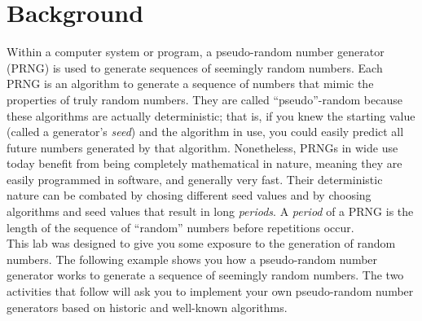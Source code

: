 	\section{Background}
		Within a computer system or program, a pseudo-random number generator (PRNG) is used to generate sequences of seemingly random numbers. Each PRNG is an algorithm to generate a sequence of numbers that mimic the properties of truly random numbers. They are called ``pseudo''-random because these algorithms are actually deterministic; that is, if you knew the starting value (called a generator's \emph{seed}) and the algorithm in use, you could easily predict all future numbers generated by that algorithm. Nonetheless, PRNGs in wide use today benefit from being completely mathematical in nature, meaning they are easily programmed in software, and generally very fast. Their deterministic nature can be combated by chosing different seed values and by choosing algorithms and seed values that result in long \emph{periods}. A \emph{period} of a PRNG is the length of the sequence of ``random'' numbers before repetitions occur.\\[\baselineskip]
		This lab was designed to give you some exposure to the generation of random numbers. The following example shows you how a pseudo-random number generator works to generate a sequence of seemingly random numbers. The two activities that follow will ask you to implement your own pseudo-random number generators based on historic and well-known algorithms.

